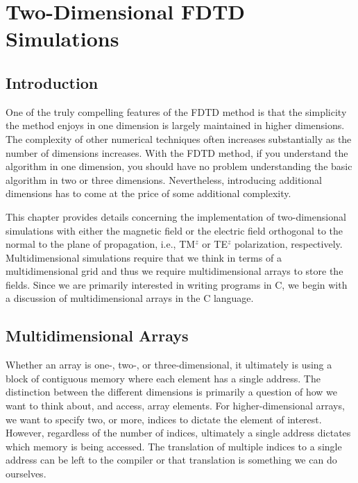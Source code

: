 \chapter{Two-Dimensional FDTD Simulations\label{chap:multi}}


\renewcommand{\thefootnote}{\fnsymbol{footnote}}

\section{Introduction}

One of the truly compelling features of the FDTD method is that the
simplicity the method enjoys in one dimension is largely maintained in
higher dimensions.  The complexity of other numerical techniques often
increases substantially as the number of dimensions increases.  With
the FDTD method, if you understand the algorithm in one dimension, you
should have no problem understanding the basic algorithm in two or
three dimensions.  Nevertheless, introducing additional dimensions has
to come at the price of some additional complexity.

This chapter provides details concerning the implementation of
two-dimensional simulations with either the magnetic field or the
electric field orthogonal to the normal to the plane of propagation,
i.e., TM$^z$ or TE$^z$ polarization, respectively.  Multidimensional
simulations require that we think in terms of a multidimensional grid
and thus we require multidimensional arrays to store the fields.
Since we are primarily interested in writing programs in C, we begin
with a discussion of multidimensional arrays in the C language.


\section{Multidimensional Arrays \label{sec:multiArrays}}

Whether an array is one-, two-, or three-dimensional, it ultimately is
using a block of contiguous memory where each element has a single
address.  The distinction between the different dimensions is
primarily a question of how we want to think about, and access, array
elements.  For higher-dimensional arrays, we want to specify two, or
more, indices to dictate the element of interest.  However, regardless
of the number of indices, ultimately a single address dictates which
memory is being accessed.  The translation of multiple indices to a
single address can be left to the compiler or that translation is
something we can do ourselves.

